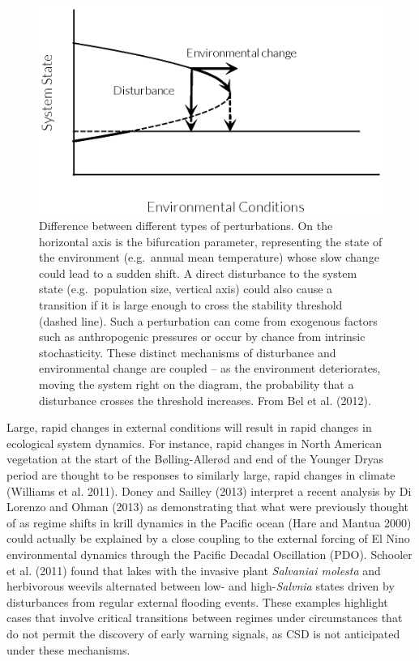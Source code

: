 \documentclass{article}
\begin{document}
\begin{figure}[htbp]
\centering
\includegraphics{Bel2012example.eps}
\caption{Difference between different types of perturbations. On the
horizontal axis is the bifurcation parameter, representing the state of
the environment (e.g.~annual mean temperature) whose slow change could
lead to a sudden shift. A direct disturbance to the system state
(e.g.~population size, vertical axis) could also cause a transition if
it is large enough to cross the stability threshold (dashed line). Such
a perturbation can come from exogenous factors such as anthropogenic
pressures or occur by chance from intrinsic stochasticity. These
distinct mechanisms of disturbance and environmental change are coupled
-- as the environment deteriorates, moving the system right on the
diagram, the probability that a disturbance crosses the threshold
increases. From Bel et al. (2012).}
\end{figure}

Large, rapid changes in external conditions will result in rapid changes
in ecological system dynamics. For instance, rapid changes in North
American vegetation at the start of the Bølling-Allerød and end of the
Younger Dryas period are thought to be responses to similarly large,
rapid changes in climate (Williams et al. 2011). Doney and Sailley
(2013) interpret a recent analysis by Di Lorenzo and Ohman (2013) as
demonstrating that what were previously thought of as regime shifts in
krill dynamics in the Pacific ocean (Hare and Mantua 2000) could
actually be explained by a close coupling to the external forcing of El
Nino environmental dynamics through the Pacific Decadal Oscillation
(PDO). Schooler et al. (2011) found that lakes with the invasive plant
\emph{Salvaniai molesta} and herbivorous weevils alternated between low-
and high-\emph{Salvnia} states driven by disturbances from regular
external flooding events. These examples highlight cases that involve
critical transitions between regimes under circumstances that do not
permit the discovery of early warning signals, as CSD is not anticipated
under these mechanisms.
\end{document}

